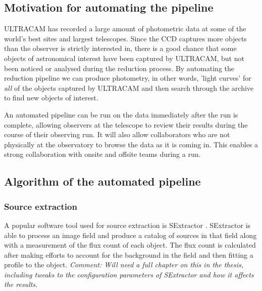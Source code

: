 \subsection{Motivation for automating the pipeline}
ULTRACAM has recorded a large amount of photometric data at some of the world's best sites and largest telescopes. Since the CCD captures more objects than the observer is strictly interested in, there is a good chance that some objects of astronomical interest have been captured by ULTRACAM, but not been noticed or analysed during the reduction process. By automating the reduction pipeline we can produce photometry, in other words, 'light curves' for \emph{all} of the objects captured by ULTRACAM and then search through the archive to find new objects of interest. 

An automated pipeline can be run on the data immediately after the run is complete, allowing observers at the telescope to review their results during the course of their observing run. It will also allow collaborators who are not physically at the observatory to browse the data as it is coming in. This enables a strong collaboration with onsite and offsite teams during a run. 

\subsection{Algorithm of the automated pipeline} 

\subsubsection{Source extraction}
A popular software tool used for source extraction is SExtractor \cite{bertin}. SExtractor is able to process an image field and produce a catalog of sources in that field along with a measurement of the flux count of each object. The flux count is calculated after making efforts to account for the background in the field and then fitting a profile to the object. \emph{Comment: Will need a full chapter on this in the thesis, including tweaks to the configuration parameters of SExtractor and how it affects the results.}

